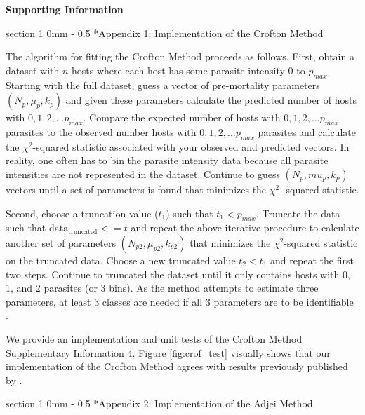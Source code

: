 \documentclass[12pt, a4paper]{article}
\makeatletter
\renewcommand{\section}{\@startsection
{section}%
{1}%
{0mm}%
{-\baselineskip}%
{0.5\baselineskip}%
{\normalfont\bf\large}} %
\makeatother
\begin{document}
\linenumbers

\doublespacing

\noindent
\Large{\textbf{Supporting Information}}

\normalsize

\section*{Appendix 1: Implementation of the Crofton Method}

The algorithm for fitting the Crofton Method \citep{Crofton1971a} proceeds as follows. First, obtain a dataset
with $n$ hosts where each host has some parasite intensity 0 to $p_{max}$. Starting
with the full dataset, guess a vector of pre-mortality parameters $(N_p, \mu_p, k_p)$ and given
these parameters calculate the predicted number of hosts with $0, 1, 2, \dots
p_{max}$.  Compare the expected number of hosts with $0, 1, 2, \dots  p_{max}$ parasites
to the observed number hosts with $0, 1, 2, \dots p_{max}$ parasites and calculate
the $\chi^2$-squared statistic associated with your observed and predicted vectors. In reality, one often has to bin the parasite intensity data because all
parasite intensities are not represented in the dataset. Continue to guess $(N_p,
mu_p, k_p)$ vectors until a set of parameters is found that minimizes the $\chi^2$-
squared statistic.

Second, choose a truncation value ($t_1$) such that $t_1 <
p_{max}$. Truncate the data such that $\text{data}_\text{truncated} <= t$ and repeat the above
iterative procedure to calculate another set of parameters $(N_{p2}, \mu_{p2}, k_{p2})$
that minimizes the $\chi^2$-squared statistic on the truncated data. Choose a new
truncated value $t_2 < t_1$ and repeat the first two steps. Continue to truncated
the dataset until it only contains hosts with 0, 1, and 2 parasites (or 3 bins).
As the method attempts to estimate three parameters, at least 3 classes are
needed if all 3 parameters are to be identifiable \citep{Royce1990}.

We provide an implementation and unit tests of the Crofton Method Supplementary Information 4.  Figure \ref{fig:crof_test} visually shows that our implementation of the Crofton Method agrees with results previously published by \cite{Crofton1971a}.

\section*{Appendix 2: Implementation of the Adjei Method}
\end{document}
